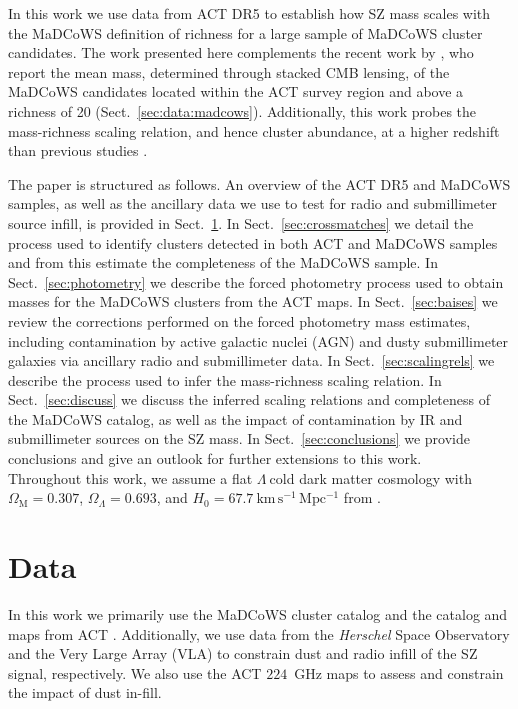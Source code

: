 \documentclass[longauth]{aa} %
\begin{document}
In this work we use data from ACT DR5 to establish how SZ mass scales with the MaDCoWS definition of richness for a large sample of MaDCoWS cluster candidates.
The work presented here complements the recent work by \cite{Madhavacheril2020}, who report the mean mass, determined through stacked CMB lensing, of the MaDCoWS candidates located within the ACT survey region and above a richness of 20 (Sect.~\ref{sec:data:madcows}). Additionally, this work probes the mass-richness scaling relation, and hence cluster abundance, at a higher redshift than previous studies \citep[e.g.,][]{Sehgal2013}.

The paper is structured as follows. An overview of the ACT DR5 and MaDCoWS samples, as well as the ancillary data we use to test for radio and submillimeter source infill, is provided in Sect.~\ref{sec:data}. 
In Sect.~\ref{sec:crossmatches} we detail the process used to identify clusters detected in both  ACT and MaDCoWS samples and from this estimate the completeness of the MaDCoWS sample.
In Sect.~\ref{sec:photometry} we describe the forced photometry process used to obtain masses for the MaDCoWS clusters from the ACT maps.
In Sect.~\ref{sec:baises} we review the corrections performed on the forced photometry mass estimates, including contamination by active galactic nuclei (AGN) and dusty submillimeter galaxies via ancillary radio and submillimeter data.
In Sect.~\ref{sec:scalingrels} we describe the process used to infer the mass-richness scaling relation. 
In Sect.~\ref{sec:discuss} we discuss the inferred scaling relations and completeness of the MaDCoWS catalog, as well as the impact of contamination by IR and submillimeter sources on the SZ mass.
In Sect.~\ref{sec:conclusions} we provide conclusions and give an outlook for further extensions to this work.\\


Throughout this work, we assume a flat $\Lambda\ $cold dark matter cosmology with $\Omega_{\mathrm{M}}=0.307$, $\Omega_{\Lambda}=0.693$, and $H_0=67.7~\mathrm{km\,s^{-1}\,Mpc^{-1}}$ from \citet{PlanckXIII}.

\section{Data}\label{sec:data}

In this work we primarily use the MaDCoWS cluster catalog \citep{Gonzalez2019catalog} and the catalog and maps from ACT \citep{Hilton2021}.
Additionally, we use data from the {\it Herschel} Space Observatory \citep{Valiante_2016, Smith_2017} and the Very Large Array (VLA) \citep{Condon1998, Lacy2020} to constrain dust and radio infill of the SZ signal, respectively. We also use the ACT $224$~GHz maps to assess and constrain the impact of dust in-fill.  
\end{document}
